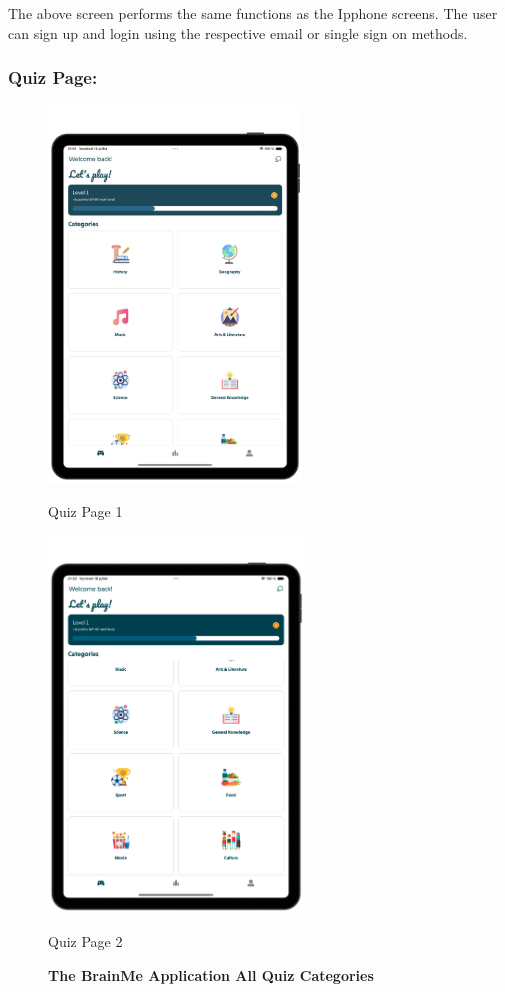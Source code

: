 The above screen performs the same functions as the Ipphone screens. The user can sign up and login using the respective email or single sign on methods.

\subsubsection{Quiz Page: }

\begin{figure}[H]
    \centering
    \begin{minipage}[b]{0.43\linewidth}
        \centering
        \includegraphics[height=10cm]{TabletUI/Quiz Page 1.png}
        \caption{Quiz Page 1}
    \end{minipage}
    \hspace{0.1\linewidth}
    \begin{minipage}[b]{0.43\linewidth}
        \centering
        \includegraphics[height=10cm]{TabletUI/Quiz Page 2.png}
        \caption{Quiz Page 2}
    \end{minipage}
    \vspace{0.5cm}
    \caption{\textbf{The BrainMe Application All Quiz Categories}}
\end{figure}


